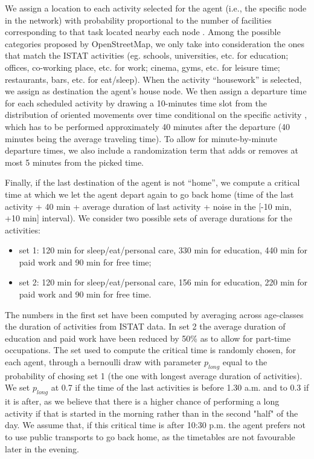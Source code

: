 We assign a location to each activity selected for the agent (i.e., the specific node in the network) with probability proportional to the number of facilities corresponding to that task located nearby each node \cite{site9}. Among the possible categories proposed by OpenStreetMap, we only take into consideration the ones that match the ISTAT activities (eg. schools, universities, etc. for education; offices, co-working place, etc. for work; cinema, gyms, etc. for leisure time; restaurants, bars, etc. for eat/sleep). When the activity “housework” is selected, we assign as destination the agent’s house node. We then assign a departure time for each scheduled activity by drawing a 10-minutes time slot from the distribution of oriented movements over time conditional on the specific activity \cite{site11}, which has to be performed approximately 40 minutes after the departure (40 minutes being the average traveling time). To allow for minute-by-minute departure times, we also include a randomization term that adds or removes at most 5 minutes from the picked time. 

Finally, if the last destination of the agent is not “home”, we compute a critical time at which we let the agent depart again to go back home (time of the last activity + 40 min + average duration of last activity \cite{site11} + noise in the [-10 min, +10 min] interval). We consider two possible sets of average durations for the activities:
\begin{itemize}
\item set 1: 120 min for sleep/eat/personal care, 330 min for education, 440 min for paid work and 90 min for free time;
\item set 2: 120 min for sleep/eat/personal care, 156 min for education, 220 min for paid work and 90 min for free time.
\end{itemize}
The numbers in the first set have been computed by averaging across age-classes the duration of activities from ISTAT data. In set 2 the average duration of education and paid work have been reduced by 50\% as to allow for part-time occupations. 
The set used to compute the critical time is randomly chosen, for each agent, through a bernoulli draw with parameter $p_{long}$ equal to the probability of chosing set 1 (the one with longest average duration of activities). We set $p_{long}$ at 0.7 if the time of the last activities is before 1.30 a.m. and to 0.3 if it is after, as we believe that there is a higher chance of performing a long activity if that is started in the morning rather than in the second "half" of the day.
We assume that, if this critical time is after 10:30 p.m. the agent prefers not to use public transports to go back home, as the timetables are not favourable later in the evening.

